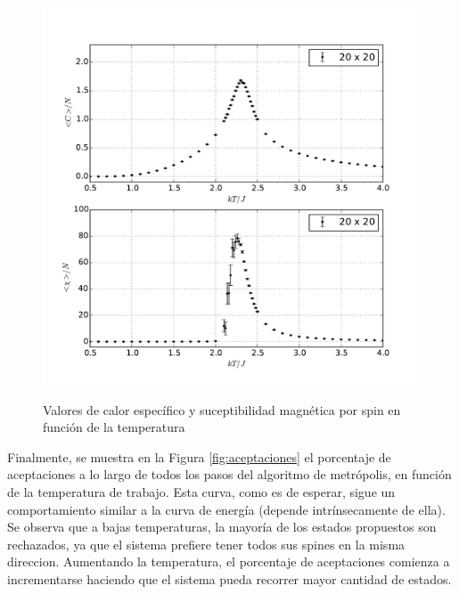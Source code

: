 \documentclass[a4paper,12pt]{article}
\begin{document}
\begin{figure}[H]
    \begin{center}
      \includegraphics[scale=0.7]{fluctuaciones.pdf} \\
      \caption{Valores de calor específico y suceptibilidad magnética por spin 
      en función de la temperatura} \label{fig:fluctuaciones}
    \end{center}
\end{figure}

Finalmente, se muestra en la Figura \eqref{fig:aceptaciones} el porcentaje de 
aceptaciones a lo largo de todos los pasos del algoritmo de metrópolis, en 
función de la temperatura de trabajo. Esta curva, como es de esperar, sigue un 
comportamiento similar a la curva de energía (depende intrínsecamente de ella). 
Se observa que a bajas temperaturas, la mayoría de los estados propuestos son 
rechazados, ya que el sistema prefiere tener todos sus spines en la misma 
direccion. Aumentando la temperatura, el porcentaje de aceptaciones comienza a 
incrementarse haciendo que el sistema pueda recorrer mayor cantidad de estados.
\end{document}
